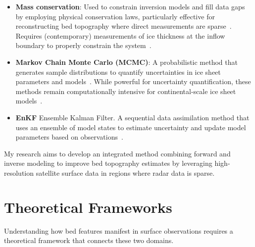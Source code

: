 \begin{itemize}
\begin{itemize}
            \item\textbf{Mass conservation}: Used to constrain inversion models and fill data gaps by employing physical conservation laws, particularly effective for reconstructing bed topography where direct measurements are sparse~\cite{Morlighem_2017, Morlighem_2020}. Requires (contemporary) measurements of ice thickness at the inflow boundary to properly constrain the system~\cite{Morlighem_Goldberg_2024}.
            \item\textbf{Markov Chain Monte Carlo (MCMC)}: A probabilistic method that generates sample distributions to quantify uncertainties in ice sheet parameters and models~\cite{Morlighem_Goldberg_2024}. While powerful for uncertainty quantification, these methods remain computationally intensive for continental-scale ice sheet models~\cite{Morlighem_Goldberg_2024}.
            \item\textbf{EnKF} Ensemble Kalman Filter. A sequential data assimilation method that uses an ensemble of model states to estimate uncertainty and update model parameters based on observations~\cite{Morlighem_Goldberg_2024}.
        \end{itemize}
\end{itemize} 
My research aims to develop an integrated method combining forward and inverse modeling to improve bed topography estimates by leveraging high-resolution satellite surface data in regions where radar data is sparse.

\newpage
\section{Theoretical Frameworks}\label{theoretical_frameworks}
Understanding how bed features manifest in surface observations requires a theoretical framework that connects these two domains.

